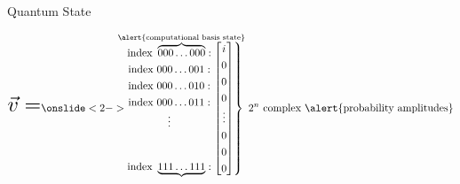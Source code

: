 \begin{frame}{Quantum State}


\[ \scalebox{2}{$ \vec v  = $} %
	\def\arraystretch{1.3}
    \onslide<2->{
    \begin{matrix*}[c]
    \text{index }\overbrace{000\dots000}^{\mathclap{\text{\alert{computational basis state}}}}:\\\text{index }{000\dots001}:\\\text{index }{000\dots010}:\\\text{index }{000\dots011}:\\\vdots\vspace{1em}\\\\\text{index }\underbrace{111\dots111}_{\vspace{3em}}:\\
    \end{matrix*}
    }
    \left.
    \begin{bmatrix*}[c]
     i \\0 \\ 0\\ 0 \\ \vdots \\ 0 \\ 0\\ 0  \\
    \end{bmatrix*}
    \right\}\text{ $2^n$ complex \alert{probability amplitudes}}
\]


\pause[4]

\centering
{}
\end{frame}
